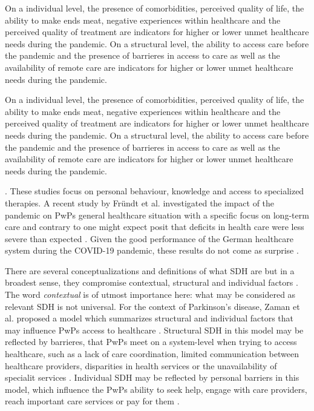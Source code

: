 \documentclass{bmcart}
\begin{document}
\iffalse
On a individual level, the presence of comorbidities, perceived quality of life, the ability to make ends meat, negative experiences within healthcare and the perceived quality of treatment are indicators for higher or lower unmet healthcare needs during the pandemic. On a structural level, the ability to access care before the pandemic and the presence of barrieres in access to care as well as the availability of remote care are indicators for higher or lower unmet healthcare needs during the pandemic.

On a individual level, the presence of comorbidities, perceived quality of life, the ability to make ends meat, negative experiences within healthcare and the perceived quality of treatment are indicators for higher or lower unmet healthcare needs during the pandemic. On a structural level, the ability to access care before the pandemic and the presence of barrieres in access to care as well as the availability of remote care are indicators for higher or lower unmet healthcare needs during the pandemic.


\cite{zipprich2020knowledge, frundt2022impact, richter2021analysis}. These studies focus on personal behaviour, knowledge and access to specialized therapies. A recent study by Fründt et al. investigated the impact of the pandemic on PwPs general healthcare situation with a specific focus on long-term care \cite{frundt2022impact} and contrary to one might expect posit that deficits in health care were less severe than expected \cite{frundt2022impact}. Given the good performance of the German healthcare system during the COVID-19 pandemic, these results do not come as surprise \cite{10665-341674}. 

There are several conceptualizations and definitions of what SDH are but in a broadest sense, they compromise contextual, structural and individual factors \cite{world2010conceptual}. The word \textit{contextual} is of utmost importance here: what may be considered as relevant SDH is not universal. For the context of Parkinson's disease, Zaman  et al. proposed a model which summarizes structural and individual factors that may influence PwPs access to healthcare \cite{zaman2021barriers}. 
Structural SDH in this model may be reflected by barrieres, that PwPs meet on a system-level when trying to access healthcare, such as a lack of care coordination, limited communication between healthcare providers, disparities in health services or the unavailability of specialit services \cite{zaman2021barriers}. Individual SDH may be reflected by personal barriers in this model, which influence the PwPs ability to seek help, engage with care providers, reach important care services or pay for them \cite{zaman2021barriers}. 
\end{document}

